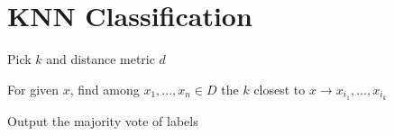 \section*{KNN Classification}

\begin{rowlist}
	\item Pick $k$ and distance metric $d$
	\item For given $x$, find among $x_1,...,x_n \in D$ the $k$ closest to $x \to x_{i_1},..., x_{i_k}$
	\item Output the majority vote of labels
\end{rowlist}
